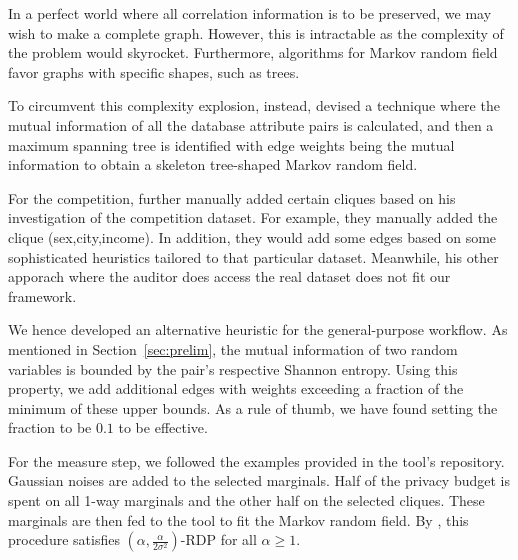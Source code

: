 \documentclass[manuscript,screen,review,anonymous]{acmart}
\begin{document}
In a perfect world where all correlation information is to be preserved, we may wish to make a complete graph. However, this is intractable as the complexity of the problem would skyrocket. Furthermore, algorithms for Markov random field favor graphs with specific shapes, such as trees.

To circumvent this complexity explosion, instead, \cite{mckenna2021winning} devised a technique where the mutual information of all the database attribute pairs is calculated, and then a maximum spanning tree is identified with edge weights being the mutual information to obtain a skeleton tree-shaped Markov random field.

For the competition, \cite{mckenna2021winning} further manually added certain cliques based on his investigation of the competition dataset. For example, they manually added the clique (sex,city,income). In addition, they would add some edges based on some sophisticated heuristics tailored to that particular dataset. Meanwhile, his other apporach where the auditor does access the real dataset does not fit our framework.

We hence developed an alternative heuristic for the general-purpose workflow. As mentioned in Section~\ref{sec:prelim}, the mutual information of two random variables is bounded by the pair's respective Shannon entropy. Using this property, we add additional edges with weights exceeding a fraction of the minimum of these upper bounds. As a rule of thumb, we have found setting the fraction to be $0.1$ to be effective.


For the measure step, we followed the examples provided in the tool's repository. Gaussian noises are added to the selected marginals. Half of the privacy budget is spent on all 1-way marginals and the other half on the selected cliques. These marginals are then fed to the tool to fit the Markov random field. By \cite{mckenna2021winning}, this procedure satisfies $(\alpha,\frac{\alpha}{2 \sigma^2})$-RDP for all $\alpha \geq 1$.
\end{document}
